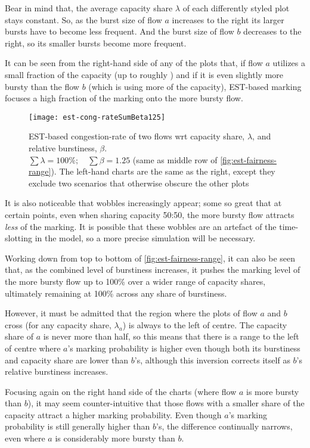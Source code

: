 Bear in mind that, the average capacity share \(\lambda\) of each differently styled plot stays constant. So, as the burst size of flow \(a\) increases to the right its larger bursts have to become less frequent. And the burst size of flow \(b\) decreases to the right, so its smaller bursts become more frequent.

It can be seen from the right-hand side of any of the plots that, if flow \(a\) utilizes a small fraction of the capacity (up to roughly ) and if it is even slightly more bursty than the flow \(b\) (which is using more of the capacity), EST-based marking focuses a high fraction of the marking onto the more bursty flow. 

\begin{figure*}
	\centering
	\texttt{[image: est-cong-rateSumBeta125]}
	\caption{EST-based congestion-rate of two flows wrt capacity share, \(\lambda\), and relative burstiness, \(\beta\).\\
		\(\sum\lambda=100\%; \quad \sum\beta=1.25\) (same as middle row of \autoref{fig:est-fairness-range}). 
		The left-hand charts are the same as the right, except they exclude two scenarios that otherwise obscure the other plots}\label{fig:cong-rate-range}
\end{figure*}

It is also noticeable that wobbles increasingly appear; some so great that at certain points, even when sharing capacity 50:50, the more bursty flow attracts \emph{less} of the marking. It is possible that these wobbles are an artefact of the time-slotting in the model, so a more precise simulation will be necessary.

Working down from top to bottom of \autoref{fig:est-fairness-range}, it can also be seen that, as the combined level of burstiness increases, it pushes the marking level of the more bursty flow up to 100\% over a wider range of capacity shares, ultimately remaining at 100\% across any share of burstiness.

However, it must be admitted that the region where the plots of flow \(a\) and \(b\) cross (for any capacity share, \(\lambda_a\)) is always to the left of centre. The capacity share of \(a\) is never more than half, so this means that there is a range to the left of centre where \(a\)'s marking probability is higher even though both its burstiness and capacity share are lower than \(b\)'s, although this inversion corrects itself as \(b\)'s relative burstiness increases.

Focusing again on the right hand side of the charts (where flow \(a\) is more bursty than \(b\)), it may seem counter-intuitive that those flows with a smaller share of the capacity attract a higher marking probability. Even though \(a\)'s marking probability is still generally higher than \(b\)'s, the difference continually narrows, even where \(a\) is considerably more bursty than \(b\).

